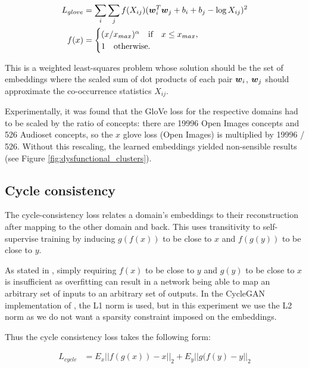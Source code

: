 \begin{equation*}
\begin{split}
L_{glove} &= \sum_i \sum_j f(X_{ij}) (\boldsymbol{w}_i^T \boldsymbol{w}_j + b_i + b_j - \log X_{ij})^2\\
f(x) &= \begin{cases}
(x/x_{max})^{\alpha}\quad \text{if} \quad x \le x_{max},\\
1\quad \text{otherwise.} \quad
\end{cases}
\end{split}
\end{equation*}

This is a weighted least-squares problem whose solution should be the set of embeddings where the scaled sum of dot products of each pair $\boldsymbol{w}_i$, $\boldsymbol{w}_j$ should approximate the co-occurrence statistics $X_{ij}$. 

Experimentally, it was found that the GloVe loss for the respective domains had to be scaled by the ratio of concepts: there are 19996 Open Images concepts and 526 Audioset concepts, so the $x$ glove loss (Open Images) is multiplied by 19996 / 526. Without this rescaling, the learned embeddings yielded non-sensible results (see Figure \ref{fig:dysfunctional_clusters}). 

\subsection{Cycle consistency}

The cycle-consistency loss relates a domain's embeddings to their reconstruction after mapping to the other domain and back. This uses transitivity to self-supervise training by inducing $g(f(x))$ to be close to $x$ and $f(g(y))$ to be close to $y$. 

As stated in \cite{CycleGAN}, simply requiring $f(x)$ to be close to $y$ and $g(y)$ to be close to $x$ is insufficient as overfitting can result in a network being able to map an arbitrary set of inputs to an arbitrary set of outputs. In the CycleGAN implementation of \cite{CycleGAN}, the L1 norm is used, but in this experiment we use the L2 norm as we do not want a sparsity constraint imposed on the embeddings. 

Thus the cycle consistency loss takes the following form:

\begin{equation*}
\begin{split}
L_{cycle} &= E_x ||f(g(x)) - x||_2 + E_y ||g(f(y) - y||_2
\end{split}
\end{equation*}

